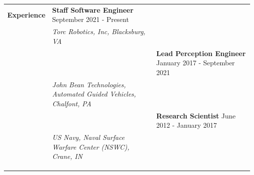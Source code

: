 \begin{tabular}{L{\hlcolw}  L{\rcolw}}
\textbf{\Large Experience} & \textbf{\large Staff Software Engineer} \hfill {\large September 2021 - Present}  
\vspace{0.05in} 
\\
& \textit{\large Torc Robotics, Inc, Blacksburg, VA} \\ 
&
\vspace{-0.2in} 

& \textbf{\large Lead Perception Engineer} \hfill {\large January 2017 - September 2021}  
\vspace{0.05in} 
\\
& \textit{\large John Bean Technologies, Automated Guided Vehicles, Chalfont, PA} \\ 
&
\vspace{-0.2in} 


& \textbf{\large Research Scientist} \hfill {\large June 2012 - January 2017}  
\vspace{0.05in} \\
& \textit{\large US Navy, Naval Surface Warfare Center (NSWC), Crane, IN} \\ 
&
\vspace{-0.2in} 

\\

\\
	\hline 
	\hline \\  
\end{tabular}
